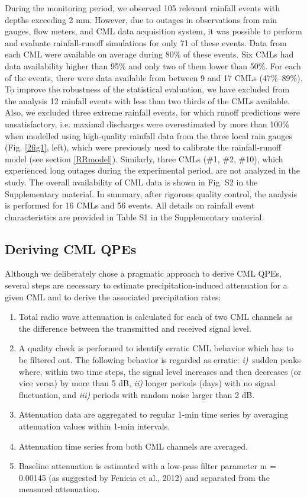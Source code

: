 \documentclass{ctuthesis}\usepackage[]{graphicx}\usepackage[]{color}
\begin{document}
During the monitoring period, we observed 105 relevant rainfall events with depths exceeding 2 mm. However, due to outages in observations from rain gauges, flow meters, and CML data acquisition system, it was possible to perform and evaluate rainfall-runoff simulations for only 71 of these events. Data from each CML were available on average during 80\% of these events. Six CMLs had data availability higher than 95\% and only two of them lower than 50\%. For each of the events, there were data available from between 9 and 17 CMLs (47\%--89\%). To improve the robustness of the statistical evaluation, we have excluded from the analysis 12 rainfall events with less than two thirds of the CMLs available. Also, we excluded three extreme rainfall events, for which runoff predictions were unsatisfactory, i.e. maximal discharges were overestimated by more than 100\% when modelled using high-quality rainfall data from the three local rain gauges (Fig. \ref{2fig1}, left), which were previously used to calibrate the rainfall-runoff model (see section \ref{RRmodel}). Similarly, three CMLs (\#1, \#2, \#10), which experienced long outages during the experimental period, are not analyzed in the study. The overall availability of CML data is shown in Fig. S2 in the Supplementary material. In summary, after rigorous quality control, the analysis is performed for 16 CMLs and 56 events. All details on rainfall event characteristics are provided in Table S1 in the Supplementary material.

\subsection{Deriving CML QPEs} \label{DerCML}

Although we deliberately chose a pragmatic approach to derive CML QPEs, several steps are necessary to estimate precipitation-induced attenuation for a given CML and to derive the associated precipitation rates:

\begin{enumerate}
        \item Total radio wave attenuation is calculated for each of two CML channels as the difference between the transmitted and received signal level. 
        \item A quality check is performed to identify erratic CML behavior which has to be filtered out. The following behavior is regarded as erratic: \emph{i)}~sudden peaks where, within two time steps, the signal level increases and then decreases (or vice versa) by more than 5 dB, \emph{ii)} longer periods (days) with no signal fluctuation, and \emph{iii)} periods with random noise larger than 2 dB. 
        \item Attenuation data are aggregated to regular 1-min time series by averaging attenuation values within 1-min intervals. 
        \item Attenuation time series from both CML channels are averaged. 
        \item Baseline attenuation is estimated with a low-pass filter parameter m = 0.00145 (as suggested by Fenicia et al., 2012) and separated from the measured attenuation.
\end{enumerate}
\end{document}
